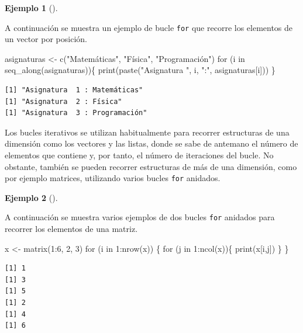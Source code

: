\documentclass[
  a4paper,
]{scrreport}
\newenvironment{Shaded}{\begin{snugshade}}{\end{snugshade}}
\newcommand{\ControlFlowTok}[1]{\textcolor[rgb]{0.00,0.23,0.31}{#1}}
\newcommand{\DecValTok}[1]{\textcolor[rgb]{0.68,0.00,0.00}{#1}}
\newcommand{\FunctionTok}[1]{\textcolor[rgb]{0.28,0.35,0.67}{#1}}
\newcommand{\NormalTok}[1]{\textcolor[rgb]{0.00,0.23,0.31}{#1}}
\newcommand{\OtherTok}[1]{\textcolor[rgb]{0.00,0.23,0.31}{#1}}
\newcommand{\SpecialCharTok}[1]{\textcolor[rgb]{0.37,0.37,0.37}{#1}}
\newcommand{\StringTok}[1]{\textcolor[rgb]{0.13,0.47,0.30}{#1}}
\theoremstyle{definition}
\theoremstyle{definition}
\newtheorem{example}{Ejemplo}[chapter]
\theoremstyle{remark}
\begin{document}
\leavevmode{}%
\begin{example}[]\label{exm-bucle-iterativo-posicion}

A continuación se muestra un ejemplo de bucle \texttt{for} que recorre
los elementos de un vector por posición.

\begin{Shaded}
\begin{Highlighting}[]
\NormalTok{asignaturas }\OtherTok{\textless{}{-}} \FunctionTok{c}\NormalTok{(}\StringTok{"Matemáticas"}\NormalTok{, }\StringTok{"Física"}\NormalTok{, }\StringTok{"Programación"}\NormalTok{)}
\ControlFlowTok{for}\NormalTok{ (i }\ControlFlowTok{in} \FunctionTok{seq\_along}\NormalTok{(asignaturas))\{}
  \FunctionTok{print}\NormalTok{(}\FunctionTok{paste}\NormalTok{(}\StringTok{"Asignatura "}\NormalTok{, i, }\StringTok{":"}\NormalTok{, asignaturas[i]))}
\NormalTok{\}}
\end{Highlighting}
\end{Shaded}

\begin{verbatim}
[1] "Asignatura  1 : Matemáticas"
[1] "Asignatura  2 : Física"
[1] "Asignatura  3 : Programación"
\end{verbatim}

\end{example}

Los bucles iterativos se utilizan habitualmente para recorrer
estructuras de una dimensión como los vectores y las listas, donde se
sabe de antemano el número de elementos que contiene y, por tanto, el
número de iteraciones del bucle. No obstante, también se pueden recorrer
estructuras de más de una dimensión, como por ejemplo matrices,
utilizando varios bucles \texttt{for} anidados.

\leavevmode{}%
\begin{example}[]\label{exm-bucles-anidados}

A continuación se muestra varios ejemplos de dos bucles \texttt{for}
anidados para recorrer los elementos de una matriz.

\begin{Shaded}
\begin{Highlighting}[]
\NormalTok{x }\OtherTok{\textless{}{-}} \FunctionTok{matrix}\NormalTok{(}\DecValTok{1}\SpecialCharTok{:}\DecValTok{6}\NormalTok{, }\DecValTok{2}\NormalTok{, }\DecValTok{3}\NormalTok{)}
\ControlFlowTok{for}\NormalTok{ (i }\ControlFlowTok{in} \DecValTok{1}\SpecialCharTok{:}\FunctionTok{nrow}\NormalTok{(x)) \{}
  \ControlFlowTok{for}\NormalTok{ (j }\ControlFlowTok{in} \DecValTok{1}\SpecialCharTok{:}\FunctionTok{ncol}\NormalTok{(x))\{}
    \FunctionTok{print}\NormalTok{(x[i,j])}
\NormalTok{  \}}
\NormalTok{\}}
\end{Highlighting}
\end{Shaded}

\begin{verbatim}
[1] 1
[1] 3
[1] 5
[1] 2
[1] 4
[1] 6
\end{verbatim}

\end{example}
\end{document}

